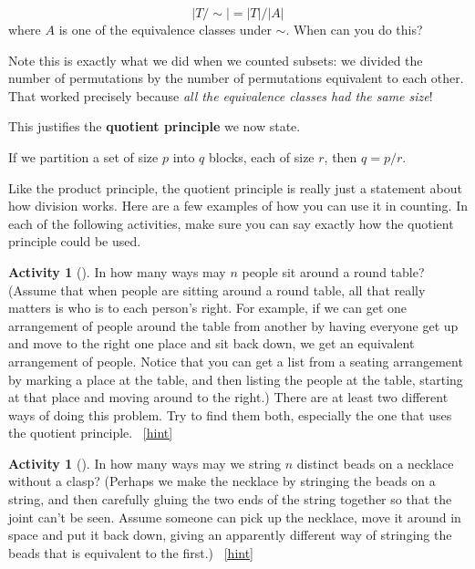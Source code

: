 \documentclass[10pt,]{book}
\newcommand{\terminology}[1]{\textbf{#1}}
\theoremstyle{plain}
\theoremstyle{definition}
\theoremstyle{definition}
\theoremstyle{definition}
\newtheorem{activity}[project]{Activity}
\numberwithin{equation}{chapter}
\begin{document}
\begin{equation*}
|T/\sim| = |T|/|A|
\end{equation*}
where \(A\) is one of the equivalence classes under \(\sim\).  When can you do this?%
\par
\hypertarget{p-761}{}%
Note this is exactly what we did when we counted subsets: we divided the number of permutations by the number of permutations equivalent to each other.  That worked precisely because \emph{all the equivalence classes had the same size}!%
\par
\hypertarget{p-762}{}%
This justifies the \terminology{quotient principle} we now state.%
\begin{assemblage}\label{assemblage-quotientprinciple}
\hypertarget{p-763}{}%
If we partition a set of size \(p\) into \(q\) blocks, each of size \(r\), then \(q = p/r\).%
\end{assemblage}
\hypertarget{p-764}{}%
Like the product principle, the quotient principle is really just a statement about how division works.  Here are a few examples of how you can use it in counting.  In each of the following activities, make sure you can say exactly how the quotient principle could be used.%
\begin{activity}[]\label{roundtable}
\hypertarget{p-765}{}%
In how many ways may \(n\) people sit around a round table? (Assume that when people are sitting around a round table, all that really matters is who is to each person's right. For example, if we can get one arrangement of people around the table from another by having everyone get up and move to the right one place and sit back down, we get an equivalent arrangement of people. Notice that you can get a list from a seating arrangement by marking a place at the table, and then listing the people at the table, starting at that place and moving around to the right.) There are at least two different ways of doing this problem. Try to find them both, especially the one that uses the quotient principle.%
~\hfill{\tiny\hyperlink{a-110}{[hint]}\hypertarget{q-110}{}}\end{activity}
\begin{activity}[]\label{necklace}
\hypertarget{p-769}{}%
In how many ways may we string \(n\) distinct beads on a necklace without a clasp? (Perhaps we make the necklace by stringing the beads on a string, and then carefully gluing the two ends of the string together so that the joint can't be seen. Assume someone can pick up the necklace, move it around in space and put it back down, giving an apparently different way of stringing the beads that is equivalent to the first.)%
~\hfill{\tiny\hyperlink{a-111}{[hint]}\hypertarget{q-111}{}}\end{activity}
\end{document}
